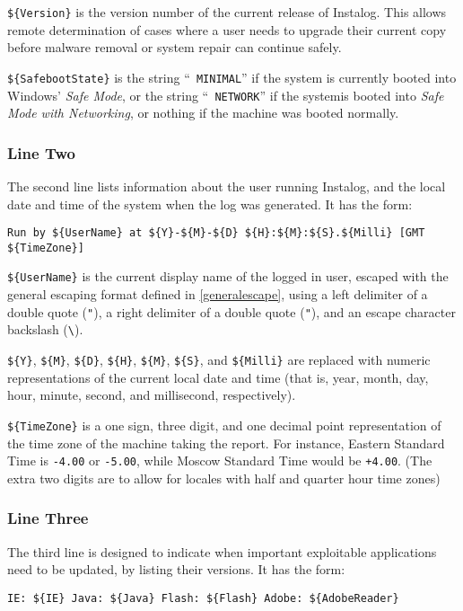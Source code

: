 \documentclass[letterpaper,12pt]{article}
\newcommand{\var}[1]{\texttt{\$\{#1\}}}
\begin{document}
\var{Version} is the version number of the current release of Instalog. This
allows remote determination of cases where a user needs to upgrade their current
copy before malware removal or system repair can continue safely.

\var{SafebootState} is the string ``\verb| MINIMAL|'' if the system is currently
booted into Windows' \textit{Safe Mode}, or the string ``\verb| NETWORK|'' if
the systemis booted into \textit{Safe Mode with Networking}, or nothing if the
machine was booted normally.

\subsubsection{Line Two}
The second line lists information about the user running Instalog, and the local
date and time of the system when the log was generated. It has the form:
\begin{verbatim}
Run by ${UserName} at ${Y}-${M}-${D} ${H}:${M}:${S}.${Milli} [GMT ${TimeZone}]
\end{verbatim}

\var{UserName} is the current display name of the logged in user, escaped with
the general escaping format defined in \ref{generalescape}, using a left
delimiter of a double quote (\verb|"|), a right delimiter of a double
quote (\verb|"|), and an escape character backslash (\verb|\|).

\var{Y}, \var{M}, \var{D}, \var{H}, \var{M}, \var{S}, and \var{Milli} are
replaced with numeric representations of the current local date and time (that
is, year, month, day, hour, minute, second, and millisecond, respectively).

\var{TimeZone} is a one sign, three digit, and one decimal point representation
of the time zone of the machine taking the report. For instance, Eastern
Standard Time is \verb|-4.00| or \verb|-5.00|, while Moscow Standard Time would
be \verb|+4.00|. (The extra two digits are to allow for locales with half and
quarter hour time zones)

\subsubsection{Line Three}
The third line is designed to indicate when important exploitable applications
need to be updated, by listing their versions. It has the form:
\begin{verbatim}
IE: ${IE} Java: ${Java} Flash: ${Flash} Adobe: ${AdobeReader}
\end{verbatim}
\end{document}

